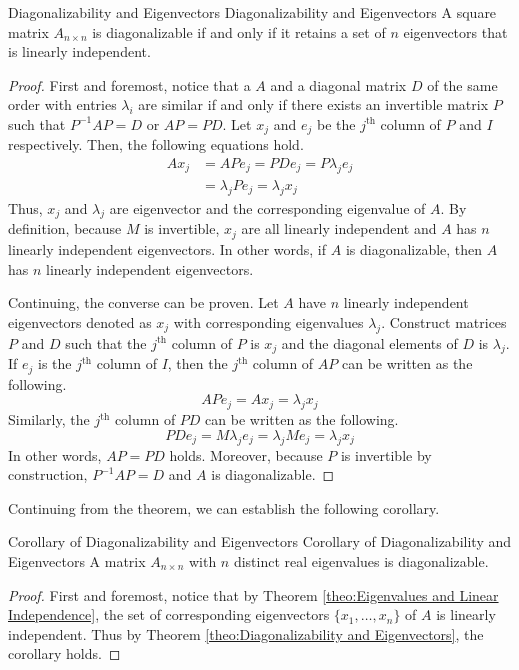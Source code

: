 \documentclass[../main.tex]{subfiles}
\begin{document}
\begin{theorem}{Diagonalizability and Eigenvectors}
{Diagonalizability and Eigenvectors}
A square matrix $A_{n \times n}$ is diagonalizable if and only if
it retains a set of $n$ eigenvectors that is linearly independent.
\end{theorem}
\begin{proof}
First and foremost, notice that a $A$ and a diagonal matrix $D$ of
the same order with entries $\lambda_i$ are similar if and only if
there exists an invertible matrix $P$ such that $P^{-1} A P = D$ or
$AP = PD$. Let $x_j$ and $e_j$ be the $j^\text{th}$ column of $P$ and
$I$ respectively. Then, the following equations hold.
\begin{align*}
    A x_j
    &= A Pe_j
    = PDe_j
    = P \lambda_j e_j \\
    &= \lambda_j P e_j
    = \lambda_j x_j
\end{align*}
Thus, $x_j$ and $\lambda_j$ are eigenvector and the corresponding
eigenvalue of $A$. By definition, because $M$ is invertible,
$x_j$ are all linearly independent and $A$ has $n$ linearly
independent eigenvectors. In other words, if $A$ is diagonalizable,
then $A$ has $n$ linearly independent eigenvectors.

Continuing, the converse can be proven. Let $A$ have $n$ linearly
independent eigenvectors denoted as $x_j$ with corresponding
eigenvalues $\lambda_j$. Construct matrices $P$ and $D$ such that
the $j^\text{th}$ column of $P$ is $x_j$ and the diagonal elements
of $D$ is $\lambda_j$. If $e_j$ is the $j^\text{th}$ column of $I$,
then the $j^\text{th}$ column of $AP$ can be written as the following.
\[
APe_j = A x_j = \lambda_j x_j
\]
Similarly, the $j^\text{th}$ column of $PD$ can be written as the
following.
\[
PDe_j = M \lambda_j e_j = \lambda_j Me_j = \lambda_j x_j
\]
In other words, $AP = PD$ holds. Moreover, because $P$ is invertible
by construction, $P^{-1} A P = D$ and $A$ is diagonalizable.
\end{proof}

Continuing from the theorem, we can establish the following corollary.

\begin{corollary}{Corollary of Diagonalizability and Eigenvectors}
{Corollary of Diagonalizability and Eigenvectors}
A matrix $A_{n \times n}$ with $n$ distinct real eigenvalues is
diagonalizable.
\end{corollary}
\begin{proof}
First and foremost, notice that by Theorem \ref{theo:Eigenvalues and
Linear Independence}, the set of corresponding eigenvectors
$\{ x_1, \ldots, x_n \}$ of $A$ is linearly independent. Thus by
Theorem \ref{theo:Diagonalizability and Eigenvectors}, the corollary
holds.
\end{proof}
\end{document}
